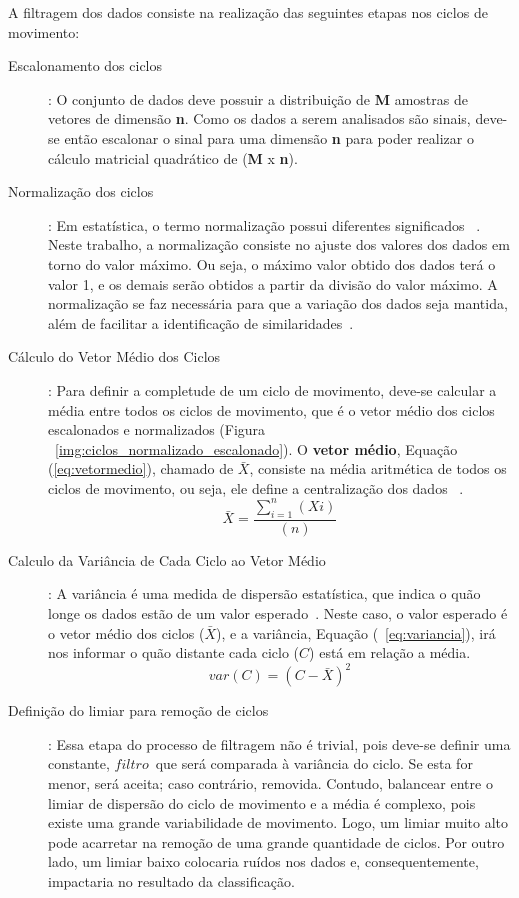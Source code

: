 A filtragem dos dados consiste na realização das seguintes etapas nos ciclos de movimento:
\begin{description}
	\item [Escalonamento dos ciclos]: O conjunto de dados deve possuir a distribuição de \textbf{M} amostras de vetores de dimensão \textbf{n}. Como os dados a serem analisados são sinais, deve-se então escalonar o sinal para uma dimensão \textbf{n} para poder realizar o cálculo matricial quadrático de (\textbf{M} x \textbf{n}).		
	\item [Normalização dos ciclos]: Em estatística, o termo normalização possui diferentes significados ~\cite{statisticterms2006}. Neste trabalho, a normalização consiste no ajuste dos valores dos dados em torno do valor máximo. Ou seja, o máximo valor obtido dos dados terá o valor 1, e os demais serão obtidos a partir da divisão do valor máximo. A normalização se faz necessária para que a variação dos dados seja mantida, além de facilitar a identificação de similaridades~\cite{vicini2005}. 	
	\item [Cálculo do Vetor Médio dos Ciclos]: Para definir a completude de um ciclo de movimento, deve-se calcular a média entre todos os ciclos de movimento, que é o vetor médio dos ciclos escalonados e normalizados (Figura ~\ref{img:ciclos_normalizado_escalonado}). O \textbf{vetor médio}, Equação (\ref{eq:vetormedio}), chamado de $\bar{X}$, consiste na média aritmética de todos os ciclos de movimento, ou seja, ele define a centralização dos dados ~\cite{statisticshandbook2009}. 	
		\begin{equation}
			\bar{X}=\frac{\sum_{i=1}^{n}(Xi)}{(n)}
			\label{eq:vetormedio}
		\end{equation}
	\item [Calculo da Variância de Cada Ciclo ao Vetor Médio]: A variância é uma medida de dispersão estatística, que indica o quão longe os dados estão de um valor esperado~\cite{statisticshandbook2009}. Neste caso, o valor esperado é o vetor médio dos ciclos ($\bar{X}$), e a variância, Equação (~\ref{eq:variancia}), irá nos informar o quão distante cada ciclo ($C$) está em relação a média.
		\begin{equation}
			var(C) = (C - \bar{X} )^2
			\label{eq:variancia}
		\end{equation}
		
		
	\item [Definição do limiar para remoção de ciclos]: Essa etapa do processo de filtragem não é trivial, pois deve-se definir uma constante, $ filtro $\, que será comparada à variância do ciclo. Se esta for menor, será aceita; caso contrário, removida. Contudo, balancear entre o limiar de dispersão do ciclo de movimento e a média é complexo, pois existe uma grande variabilidade de movimento. Logo, um limiar muito alto pode acarretar na remoção de uma grande quantidade de ciclos. Por outro lado, um limiar baixo colocaria ruídos nos dados e, consequentemente, impactaria no resultado da classificação.	
	\lstset{language=Matlab}
	\begin{lstlisting}[frame=single, caption=Filtro dos Ciclos]  % Start your code-block
		

\end{lstlisting}
\end{description}
